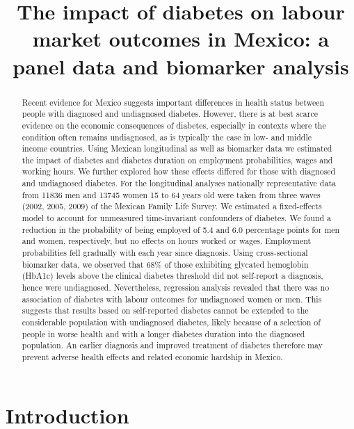 \documentclass[12pt,english]{article}
\begin{document}
	\title{The impact of diabetes on labour market outcomes in Mexico: a panel data and biomarker analysis}
	\author{}
	\date{}
	
	\maketitle 
	\thispagestyle{empty}
	\clearpage

	
\begin{abstract}
Recent evidence for Mexico suggests important differences in health status between people with diagnosed and undiagnosed diabetes. However, there is at best scarce evidence on the economic consequences of diabetes, especially in contexts where the condition often remains undiagnosed, as is typically the case in low- and middle income countries. Using Mexican longitudinal as well as biomarker data we estimated the impact of diabetes and diabetes duration on employment probabilities, wages and working hours. We further explored how these effects differed for those with diagnosed and undiagnosed diabetes. For the longitudinal analyses nationally representative data from 11836 men and 13745 women 15 to 64 years old were taken from three waves (2002, 2005, 2009) of the Mexican Family Life Survey. We estimated a fixed-effects model to account for unmeasured time-invariant confounders of diabetes. We found a reduction in the probability of being employed of 5.4 and 6.0 percentage points for men and women, respectively, but no effects on hours worked or wages. Employment probabilities fell gradually with each year since diagnosis. Using cross-sectional biomarker data, we observed that 68\% of those exhibiting glycated hemoglobin (HbA1c) levels above the clinical diabetes threshold did not self-report a diagnosis, hence were undiagnosed. Nevertheless, regression analysis revealed that there was no association of diabetes with labour outcomes for undiagnosed women or men. This suggests that results based on self-reported diabetes cannot be extended to the considerable population with undiagnosed diabetes, likely because of a selection of people in worse health and with a longer diabetes duration into the diagnosed population. An earlier diagnosis and improved treatment of diabetes therefore may prevent adverse health effects and related economic hardship in Mexico.
\end{abstract}


\section{\label{sec:Introduction}Introduction }
\end{document}
